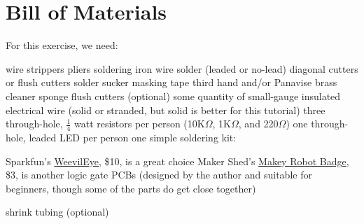 \documentclass[12pt]{article}
\begin{document}
\begin{center}
\end{center}

\newpage

\section{Bill of Materials}

For this exercise, we need:
\begin{enumerate}
\+ wire strippers
\+ pliers
\+ soldering iron
\+ wire solder (leaded or no-lead)
\+ diagonal cutters or flush cutters
\+ solder sucker
\+ masking tape
\+ third hand and/or Panavise
\+ brass cleaner sponge
\+ flush cutters (optional)
\+ some quantity of small-gauge insulated electrical wire (solid or stranded, but solid is better for this tutorial)
\+ three through-hole, $\frac{1}{4}$ watt resistors per person (10K$\Omega$, 1K$\Omega$, and 220$\Omega$)
\+ one through-hole, leaded LED per person
\+ one simple soldering kit:
	\begin{itemize} 
	\+ Sparkfun's {\color{webblue}\href{https://www.sparkfun.com/products/10723}{WeevilEye}}, \$10, is a great choice
	\+ Maker Shed's {\color{webblue}\href{http://www.makershed.com/products/learn-to-solder-skill-badge-kit}{Makey Robot Badge}}, \$3, is another
	\+ logic gate PCBs (designed by the author and suitable for beginners, though some of the parts do get close together)
	\end{itemize}
\+ shrink tubing (optional)
\end{enumerate}
\end{document}
